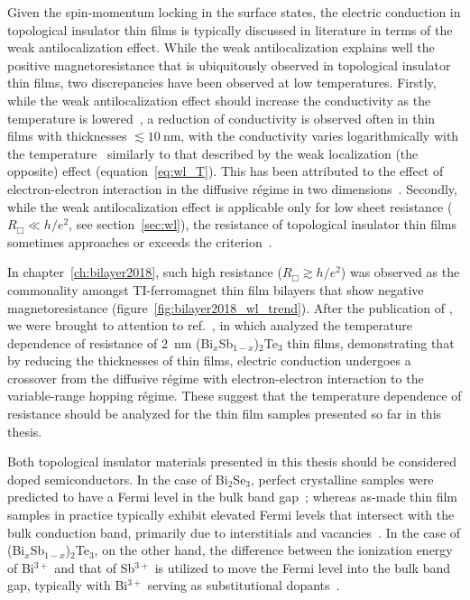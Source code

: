 Given the spin-momentum locking in the surface states, the electric conduction in topological insulator thin films is typically discussed in literature in terms of the weak antilocalization effect. While the weak antilocalization explains well the positive magnetoresistance that is ubiquitously observed in topological insulator thin films, two discrepancies have been observed at low temperatures. Firstly, while the weak antilocalization effect should increase the conductivity as the temperature is lowered~\cite{bergmann1984}, a reduction of conductivity is observed often in thin films with thicknesses $\lesssim 10~\mathrm{nm}$, with the conductivity varies logarithmically with the temperature~\cite{Chen2011, Liu2011, Roy2013} similarly to that described by the weak localization (the opposite) effect (equation~\ref{eq:wl_T}). This has been attributed to the effect of electron-electron interaction in the diffusive r\'egime in two dimensions~\cite{WL_ee}. Secondly, while the weak antilocalization effect is applicable only for low sheet resistance ($R_\Box \ll h/e^2$, see section~\ref{sec:wl}), the resistance of topological insulator thin films sometimes approaches or exceeds the criterion~\cite{TI_WAL_thickness, ZhangJS2011}.

In chapter~\ref{ch:bilayer2018}, such high resistance ($R_\Box \gtrsim h/e^2$) was observed as the commonality amongst TI-ferromagnet thin film bilayers that show negative magnetoresistance (figure~\ref{fig:bilayer2018_wl_trend}). After the publication of \cite{bilayer2018}, we were brought to attention to ref.~\cite{liao2015}, in which \citeauthor{liao2015} analyzed the temperature dependence of resistance of \SI{2}{nm} (Bi$_x$Sb$_{1-x}$)$_2$Te$_3$ thin films, demonstrating that by reducing the thicknesses of thin films, electric conduction undergoes a crossover from the diffusive r\'egime with electron-electron interaction to the variable-range hopping r\'egime. These suggest that the temperature dependence of resistance should be analyzed for the thin film samples presented so far in this thesis.

Both topological insulator materials presented in this thesis should be considered doped semiconductors. In the case of Bi$_2$Se$_3$, perfect crystalline samples were predicted to have a Fermi level in the bulk band gap~\cite{TI_electronic_structure_zhang}; whereas as-made thin film samples in practice typically exhibit elevated Fermi levels that intersect with the bulk conduction band, primarily due to interstitials and vacancies~\cite{TI_ARPES1, ARPES_thickness, zhangli2013, Zhanybek3, Fisher2010}. In the case of (Bi$_x$Sb$_{1-x}$)$_2$Te$_3$, on the other hand, the difference between the ionization energy of Bi$^{3+}$ and that of Sb$^{3+}$ is utilized to move the Fermi level into the bulk band gap, typically with Bi$^{3+}$ serving as substitutional dopants~\cite{ZhangJS2011, TI_electronic_structure_zhang}.

